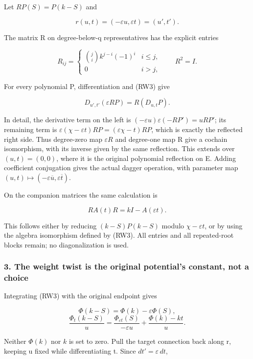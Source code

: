\documentclass{article}
\begin{document}
Let \(RP(S)=P(k-S)\) and

\[
r(u,t)=(-\varepsilon u,\varepsilon t)=(u',t').
\tag{RW6}
\]

The matrix R on degree-below-q representatives has the explicit entries

\[
R_{ij}=\begin{cases}\binom ji k^{j-i}(-1)^i&i\le j,\\0&i>j,
\end{cases}\qquad R^2=I.
\tag{RW7}
\]

For every polynomial P, differentiation and (RW3) give

\[
D_{u',t'}(\varepsilon RP)=R(D_{u,t}P).
\tag{RW8}
\]

In detail, the derivative term on the left is \((-\varepsilon u)\varepsilon(-RP')=uRP'\); its remaining term is \(\varepsilon(\chi-\varepsilon t)RP=(\varepsilon\chi-t)RP\), which is exactly the reflected right side. Thus degree-zero map \(\varepsilon R\) and degree-one map R give a cochain isomorphism, with its inverse given by the same reflection. This extends over \((u,t)=(0,0)\), where it is the original polynomial reflection on E. Adding coefficient conjugation gives the actual dagger operation, with parameter map \((u,t)\mapsto(-\varepsilon\overline u,\varepsilon\overline t)\).

On the companion matrices the same calculation is

\[
R A(t)R=kI-A(\varepsilon t).
\tag{RW9}
\]

This follows either by reducing \((k-S)P(k-S)\) modulo \(\chi-\varepsilon t\), or by using the algebra isomorphism defined by (RW3). All entries and all repeated-root blocks remain; no diagonalization is used.

\subsubsection{3. The weight twist is the original potential's constant, not a choice}\label{endpoint-f1_reflection--the-weight-twist-is-the-original-potentials-constant-not-a-choice}

Integrating (RW3) with the original endpoint gives

\[
\Phi(k-S)=\Phi(k)-\varepsilon\Phi(S),
\] \[
\boxed{\frac{\Phi_t(k-S)}u
=\frac{\Phi_{\varepsilon t}(S)}{-\varepsilon u}
 +\frac{\Phi(k)-kt}{u}.}
\tag{RW10}
\]

Neither \(\Phi(k)\) nor \(k\) is set to zero. Pull the target connection back along r, keeping u fixed while differentiating t. Since \(dt'=\varepsilon\,dt\),
\end{document}
